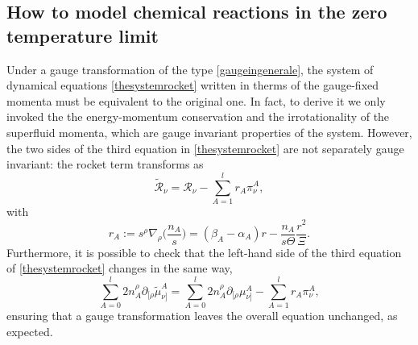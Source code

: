 \documentclass[usenatbib]{mnras}
\begin{document}
\subsection{How to model chemical reactions in the zero temperature limit}
\label{bellofigo}

Under a gauge transformation of the type \eqref{gaugeingenerale}, the  system of dynamical equations \eqref{thesystemrocket} written in therms of the gauge-fixed momenta must be equivalent to the original one. In fact, to derive it we only invoked the the energy-momentum conservation and the irrotationality of the superfluid momenta, which are gauge invariant properties of the system. 
However, the two sides of the third equation in \eqref{thesystemrocket} are not separately gauge invariant: the rocket term  transforms as
%
\begin{equation}
\tilde{\mathcal{R}}_\nu = \mathcal{R}_\nu - \sum_{A=1}^l r_A \pi^A_\nu,
\end{equation}
%
with
%
\begin{equation}
r_A := s^\rho \nabla_\rho \bigg( \dfrac{n_A}{s} \bigg) = (\beta_A -\alpha_A)r - \dfrac{n_A}{s \Theta} \dfrac{r^2}{\Xi}.
\end{equation}
%
Furthermore, it is possible to check that  the left-hand side of the third equation of \eqref{thesystemrocket} changes in the same way,
%
\begin{equation}
 \sum_{A=0}^l 2n_A^\rho \partial_{[\rho}\tilde{\mu}^A_{\nu]} =  \sum_{A=0}^l 2n_A^\rho \partial_{[\rho}\mu^A_{\nu]}  - \sum_{A=1}^l r_A \pi^A_\nu,
\end{equation}
%
ensuring that a gauge transformation leaves the overall equation unchanged, as  expected.
\end{document}
